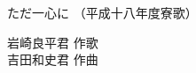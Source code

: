 \documentclass[10pt,b5j]{tarticle} %
\begin{document}
\begin{minipage}[c]{0.7\hsize} %
    \begin{center}
        {\LARGE
            ただ一心に %
        }
        {\small 
            （平成十八年度寮歌） %
        }
    \end{center}
\end{minipage}
\begin{minipage}[c]{0.3\hsize} %
    \begin{flushright} %
        岩崎良平君 作歌\\吉田和史君 作曲 %
    \end{flushright}
\end{minipage}
\end{document}
